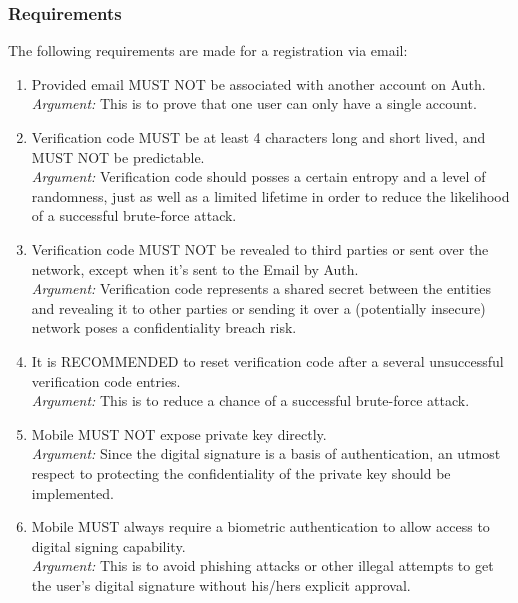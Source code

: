            \subsubsection{Requirements}
            The following requirements are made for a registration via email:
            \begin{enumerate}
                  \item Provided email MUST NOT be associated with another account on Auth.\\
                  \textit{Argument:} This is to prove that one user can only have a single account.

                  \item Verification code MUST be at least 4 characters long and short lived, and MUST NOT be 
                        predictable.\\        
                  \textit{Argument:} Verification code should posses a certain entropy and a level of randomness, 
                  just as well as a limited lifetime in order to reduce the likelihood of a 
                  successful brute-force attack.

                  \item Verification code MUST NOT be revealed to third parties or sent over the network, except when
                        it's sent to the Email by Auth.\\        
                  \textit{Argument:} Verification code represents a shared secret between the entities and revealing 
                  it to other parties or sending it over a (potentially insecure) network poses 
                  a confidentiality breach risk. 

                  \item It is RECOMMENDED to reset verification code after a several unsuccessful verification 
                        code entries.\\        
                  \textit{Argument:} This is to reduce a chance of a successful brute-force attack.

                  \item Mobile MUST NOT expose private key directly.\\
                  \textit{Argument:} Since the digital signature is a basis of authentication, an utmost respect to 
                  protecting the confidentiality of the private key should be implemented.

                  \item Mobile MUST always require a biometric authentication to allow access to digital signing 
                        capability.\\        
                  \textit{Argument:} This is to avoid phishing attacks or other illegal attempts to get the user's 
                  digital signature without his/hers explicit approval.


\end{enumerate}
